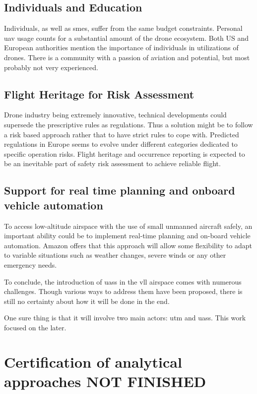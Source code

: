 \subsection{Individuals and Education}

Individuals, as well as \gls{sme}s, suffer from the same budget constraints. Personal \gls{uav} 
usage counts for a substantial amount of the drone ecosystem.  Both US and European 
authorities mention the importance of individuals in utilizations of drones. There is a community 
with a passion of aviation and potential, but most probably not very experienced.  

\subsection{Flight Heritage for Risk Assessment}

Drone industry being extremely innovative, technical developments could supersede the 
prescriptive rules as regulations. Thus a solution might be to follow a risk based approach 
rather that to have strict rules to cope with. Predicted regulations in Europe seems to evolve 
under different categories dedicated to specific operation risks. Flight heritage and occurrence 
reporting is expected to be an inevitable part of safety risk assessment to achieve reliable flight. 

\subsection{Support for real time planning and onboard vehicle automation}
To access low-altitude airspace with the use of small unmanned aircraft safely, an important 
ability could be to implement real-time planning and on-board vehicle automation. Amazon 
offers that this approach will allow some flexibility to adapt to variable situations such as 
weather changes, severe winds or any other emergency needs.

To conclude, the introduction of \gls{uas}s in the \gls{vll} airspace comes with numerous challenges. 
Though various ways to address them have been proposed, there is still no certainty about how it will be done in the end.

One sure thing is that it will involve two main actors: \gls{utm} and \gls{uas}s. This work focused on the later.	

\section{Certification of analytical approaches NOT FINISHED }\label{ch2:certificationOfAnalyticalApproaches}


